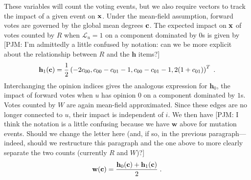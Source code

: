 \documentclass[review, onefignum, onetabnum]{siamart171218}
\newcommand{\pjm}[1]{{\color{blue}[PJM: #1]}}
\begin{document}
		These variables will count the voting events, but we also require vectors to track the impact of a given event on $\mathbf{x}$. 
		Under the mean-field assumption, forward votes are governed by the global mean degrees $\mathbf{c}$. 
		The expected impact on $\mathbf{x}$ of votes counted by $R$ when $\mathcal{L}_u = 1$ on a component dominated by $0$s is given by \pjm{I'm admittedly a little confused by notation: can we be more explicit about the relationship between $R$ and the $\mathbf{h}$ items?}
		\begin{align}
			\mathbf{h}_1(\mathbf{c}) = \frac{1}{2}\left(-2c_{00} , c_{00} - c_{01} - 1, c_{00} - c_{01} - 1, 2(1+c_{01})\right)^T\;.
		\end{align}
		Interchanging the opinion indices gives the analogous expression for $\mathbf{h}_0$, the impact of forward votes when $u$ has opinion $0$ on a component dominated by $1$s. 
		Votes counted by $W$ are again mean-field approximated. 
		Since these edges are no longer connected to $u$, their impact is independent of $i$. 
		We then have \pjm{I think the notation is a little confusing because we have $\mathbf{w}$ above for mutation events. Should we change the letter here (and, if so, in the previous paragraph---indeed, should we restructure this paragraph and the one above to more clearly separate the two counts (currently $R$ and $W$)?}
		\begin{align}
			\mathbf{w}(\mathbf{c}) = \frac{\mathbf{h}_0(\mathbf{c}) + \mathbf{h}_1(\mathbf{c})}{2}\;.
		\end{align}
\end{document}
